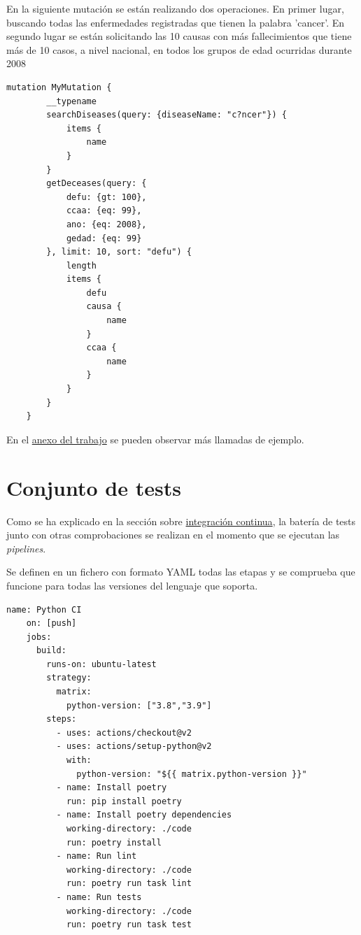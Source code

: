 En la siguiente mutación se están realizando dos operaciones. En primer lugar, buscando
todas las enfermedades registradas que tienen la palabra 'cancer'. En segundo lugar se
están solicitando las 10 causas con más fallecimientos que tiene más de 10 casos, a nivel
nacional, en todos los grupos de edad ocurridas durante 2008
\begin{lstlisting}[caption=Ejemplo de mutación usando el protocolo GraphQL] 
    mutation MyMutation {
        __typename
        searchDiseases(query: {diseaseName: "c?ncer"}) {
            items {
                name
            }
        }
        getDeceases(query: {
            defu: {gt: 100}, 
            ccaa: {eq: 99}, 
            ano: {eq: 2008}, 
            gedad: {eq: 99}
        }, limit: 10, sort: "defu") {
            length
            items {
                defu
                causa {
                    name
                }
                ccaa {
                    name
                }
            }
        }
    }
\end{lstlisting}

En el \hyperref[sec:ejemplos]{anexo del trabajo} se pueden observar más llamadas de ejemplo.

\section{Conjunto de tests}
Como se ha explicado en la sección sobre \hyperref[sec:ci]{integración continua}, la
batería de tests junto con otras comprobaciones se realizan en el momento que se ejecutan las \textit{pipelines}.

Se definen en un fichero con formato YAML todas las etapas y se comprueba que funcione para todas
las versiones del lenguaje que soporta.
\begin{lstlisting}[caption=Definición de las etapas que tiene la CI del código del proyecto. ]
    name: Python CI
    on: [push]
    jobs:
      build:
        runs-on: ubuntu-latest
        strategy:
          matrix:
            python-version: ["3.8","3.9"]
        steps:
          - uses: actions/checkout@v2
          - uses: actions/setup-python@v2
            with:
              python-version: "${{ matrix.python-version }}"
          - name: Install poetry
            run: pip install poetry
          - name: Install poetry dependencies
            working-directory: ./code
            run: poetry install
          - name: Run lint
            working-directory: ./code
            run: poetry run task lint
          - name: Run tests
            working-directory: ./code
            run: poetry run task test
\end{lstlisting}

